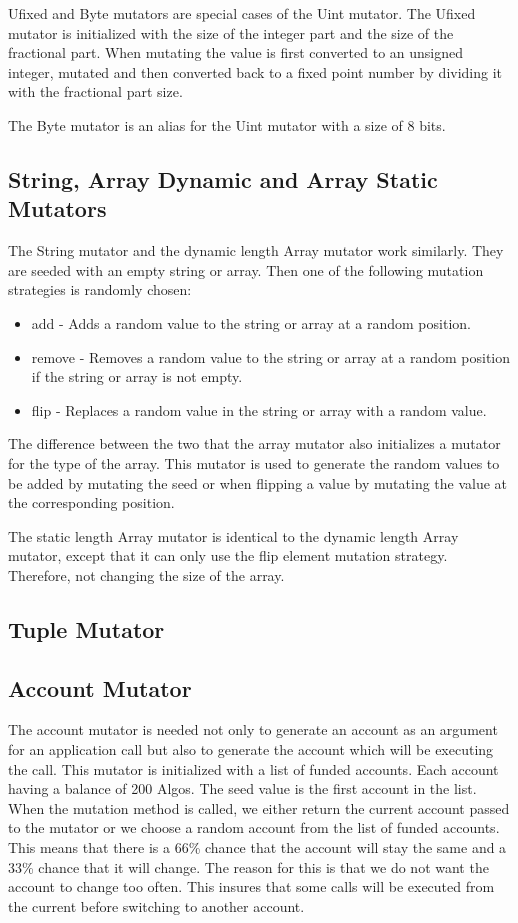 Ufixed and Byte mutators are special cases of the Uint mutator. The Ufixed mutator is initialized with the size of the integer part and the size of the fractional part. When mutating the value is first converted to an unsigned integer, mutated and then converted back to a fixed point number by dividing it with the fractional part size.

The Byte mutator is an alias for the Uint mutator with a size of 8 bits.

\subsection*{String, Array Dynamic and Array Static Mutators}
The String mutator and the dynamic length Array mutator work similarly. They are seeded with an empty string or array. Then one of the following mutation strategies is randomly chosen:
\begin{itemize}
    \item add - Adds a random value to the string or array at a random position.
    \item remove - Removes a random value to the string or array at a random position if the string or array is not empty.
    \item flip - Replaces a random value in the string or array with a random value.
\end{itemize}

The difference between the two that the array mutator also initializes a mutator for the type of the array.
This mutator is used to generate the random values to be added by mutating the seed or when flipping a value by mutating the value at the corresponding position.

The static length Array mutator is identical to the dynamic length Array mutator, except that it can only use the flip element mutation strategy.
Therefore, not changing the size of the array.

\subsection*{Tuple Mutator}

\subsection*{Account Mutator}
The account mutator is needed not only to generate an account as an argument for an application call but also to generate the account which will be executing the call.
This mutator is initialized with a list of funded accounts.
Each account having a balance of 200 Algos.
The seed value is the first account in the list.
When the mutation method is called, we either return the current account passed to the mutator or we choose a random account from the list of funded accounts.
This means that there is a 66\% chance that the account will stay the same and a 33\% chance that it will change.
The reason for this is that we do not want the account to change too often.
This insures that some calls will be executed from the current before switching to another account.

